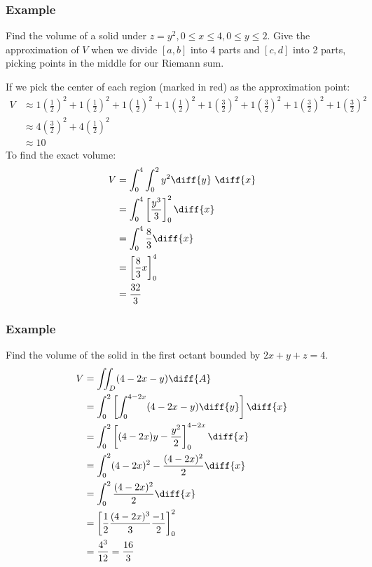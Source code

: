 \documentclass[letterpaper, 12pt]{math}
\begin{document}
\subsubsection*{Example}
Find the volume of a solid under \( z = y^2, 0\le x\le4, 0\le y\le2 \). Give
the approximation of \( V \) when we divide \( [a,b] \) into 4 parts and
\( [c,d] \) into 2 parts, picking points in the middle for our Riemann sum.
\begin{center}
\end{center}
If we pick the center of each region (marked in red) as the approximation point:
\begin{align*}
  V &\approx
    1(\frac{1}{2})^2+1(\frac{1}{2})^2+1(\frac{1}{2})^2+1(\frac{1}{2})^2+
    1(\frac{3}{2})^2+1(\frac{3}{2})^2+1(\frac{3}{2})^2+1(\frac{3}{2})^2 \\
  &\approx 4(\frac{3}{2})^2+4(\frac{1}{2})^2 \\
  &\approx 10
\end{align*}
To find the exact volume:
\begin{align*}
  V &= \int_{0}^{4}\int_{0}^{2}y^2\diff{y}~\diff{x} \\
  &= \int_{0}^{4}\left[\frac{y^3}{3}\right]_0^2\diff{x} \\
  &= \int_{0}^{4}\frac{8}{3}\diff{x} \\
  &= \left[\frac{8}{3}x\right]_0^4 \\
  &= \frac{32}{3}
\end{align*}

\subsubsection*{Example}
Find the volume of the solid in the first octant bounded by \( 2x+y+z = 4 \).
\begin{align*}
  V &= \iint_{D}(4-2x-y)\diff{A} \\
  &= \int_{0}^{2}\left[\int_{0}^{4-2x}(4-2x-y)\diff{y}\right]\diff{x} \\
  &= \int_{0}^{2}\left[(4-2x)y-\frac{y^2}{2}\right]_0^{4-2x}\diff{x} \\
  &= \int_{0}^{2}(4-2x)^2-\frac{(4-2x)^2}{2}\diff{x} \\
  &= \int_{0}^{2}\frac{(4-2x)^2}{2}\diff{x} \\
  &= \left[\frac{1}{2}\frac{(4-2x)^3}{3}\frac{-1}{2}\right]_{0}^{2} \\
  &= \frac{4^3}{12} = \frac{16}{3}
\end{align*}
\end{document}

